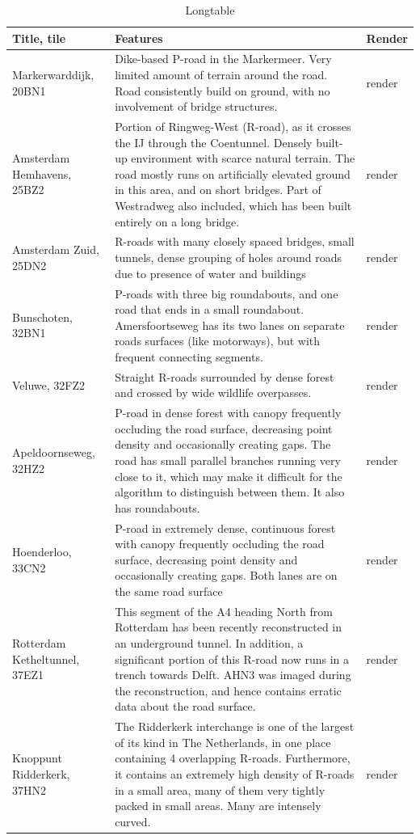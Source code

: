 \begin{longtable}[c]{@{}p{2.6cm}p{7cm}p{6cm}@{}}%
\caption{Longtable \label{tab:longtab1}}\\ \toprule %
\toprule
Title, tile  & Features & Render \\ \midrule
Markerwarddijk, 20BN1 & Dike-based P-road in the Markermeer. Very limited amount of terrain around the road. Road consistently build on ground, with no involvement of bridge structures. & render \\
Amsterdam Hemhavens, 25BZ2 & Portion of Ringweg-West (R-road), as it crosses the IJ through the Coentunnel. Densely built-up environment with scarce natural terrain. The road mostly runs on artificially elevated ground in this area, and on short bridges. Part of Westradweg also included, which has been built entirely on a long bridge. & render \\
Amsterdam Zuid, 25DN2 & R-roads with many closely spaced bridges, small tunnels, dense grouping of holes around roads due to presence of water and buildings & render \\
Bunschoten, 32BN1 & P-roads with three big roundabouts, and one road that ends in a small roundabout. Amersfoortseweg has its two lanes on separate roads surfaces (like motorways), but with frequent connecting segments. & render \\
Veluwe, 32FZ2 & Straight R-roads surrounded by dense forest and crossed by wide wildlife overpasses. & render \\
Apeldoornseweg, 32HZ2 & P-road in dense forest with canopy frequently occluding the road surface, decreasing point density and occasionally creating gaps. The road has small parallel branches running very close to it, which may make it difficult for the algorithm to distinguish between them. It also has roundabouts. & render \\
Hoenderloo, 33CN2 & P-road in extremely dense, continuous forest with canopy frequently occluding the road surface, decreasing point density and occasionally creating gaps. Both lanes are on the same road surface & render \\
Rotterdam Ketheltunnel, 37EZ1 & This segment of the A4 heading North from Rotterdam has been recently reconstructed in an underground tunnel. In addition, a significant portion of this R-road now runs in a trench towards Delft. AHN3 was imaged during the reconstruction, and hence contains erratic data about the road surface. & render \\
Knoppunt Ridderkerk, 37HN2 & The Ridderkerk interchange is one of the largest of its kind in The Netherlands, in one place containing 4 overlapping R-roads. Furthermore, it contains an extremely high density of R-roads in a small area, many of them very tightly packed in small areas. Many are intensely curved. & render \\

\end{longtable}
